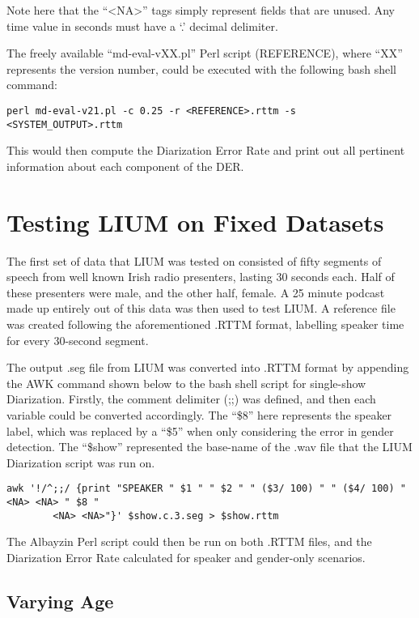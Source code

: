 \doublespacing
\noindent Note here that the ``<NA>'' tags simply represent fields that are unused. Any time value in seconds must have a `.' decimal delimiter. \par
The freely available ``md-eval-vXX.pl'' Perl script (REFERENCE), where ``XX'' represents the version number, could be executed with the following bash shell command:

\begin{lstlisting}
perl md-eval-v21.pl -c 0.25 -r <REFERENCE>.rttm -s <SYSTEM_OUTPUT>.rttm
\end{lstlisting}

\noindent This would then compute the Diarization Error Rate and print out all pertinent information about each component of the DER.

\section{Testing LIUM on Fixed Datasets}

The first set of data that LIUM was tested on consisted of fifty segments of speech from well known Irish radio presenters, lasting 30 seconds each. Half of these presenters were male, and the other half, female. A 25 minute podcast made up entirely out of this data was then used to test LIUM. A reference file was created following the aforementioned .RTTM format, labelling speaker time for every 30-second segment. \par
The output .seg file from LIUM was converted into .RTTM format by appending the AWK command shown below to the bash shell script for single-show Diarization. Firstly, the comment delimiter (;;) was defined, and then each variable could be converted accordingly. The ``\$8'' here represents the speaker label, which was replaced by a ``\$5'' when only considering the error in gender detection. The ``\$show'' represented the base-name of the .wav file that the LIUM Diarization script was run on.

\begin{lstlisting}
awk '!/^;;/ {print "SPEAKER " $1 " " $2 " " ($3/ 100) " " ($4/ 100) " <NA> <NA> " $8 " 
		<NA> <NA>"}' $show.c.3.seg > $show.rttm
\end{lstlisting}

\noindent The Albayzin Perl script could then be run on both .RTTM files, and the Diarization Error Rate calculated for speaker and gender-only scenarios.

\subsection{Varying Age}

